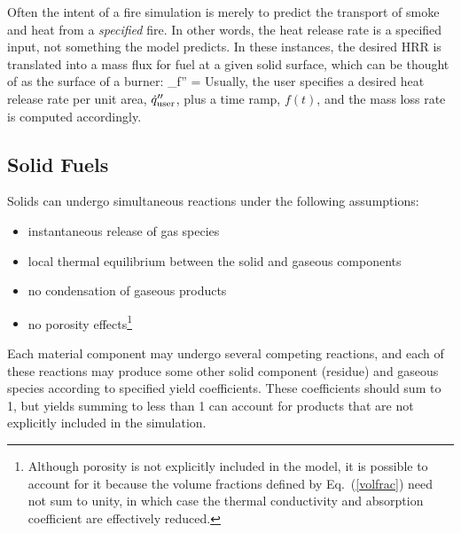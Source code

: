 Often the intent of a fire simulation is merely to predict the transport of smoke and heat from a {\em specified} fire. In other words, the heat release rate is a specified input, not something the model predicts. In these instances, the desired HRR is translated into a mass flux for fuel at a given solid surface, which can be thought of as the surface of a burner:
\be
   \dm_{\rm f}'' = 
\ee
Usually, the user specifies a desired heat release rate per unit area, $\dot{q}_{\rm user}''$, plus a time ramp, $f(t)$, and the mass loss rate is computed accordingly.

\subsection{Solid Fuels}

Solids can undergo simultaneous reactions under the following assumptions:
\begin{itemize}
\setlength{\itemsep}{0.0in}
\item instantaneous release of gas species
\item local thermal equilibrium between the solid and gaseous components
\item no condensation of gaseous products
\item no porosity effects\footnote{Although porosity is not explicitly included in the model, it is possible to account for it because the volume fractions defined by Eq.~(\ref{volfrac}) need not sum to unity, in which case the thermal conductivity and absorption coefficient are effectively reduced.}
\end{itemize}
Each material component may undergo several competing reactions, and each of these reactions may produce some other solid component (residue) and gaseous species according to specified yield coefficients.  These coefficients should sum to 1, but yields summing to less than 1 can account for products that are not explicitly included in the simulation.

